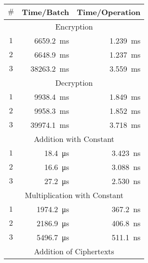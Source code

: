 \documentclass{article}
\begin{document}
        \begin{center}
            \begin{tabular}{| c | r | r |}
                \hline
                $\#$ & Time/Batch & Time/Operation
                \\ \hline
                \multicolumn{3}{|c|}{Encryption}
                \\ \hline
                $1$ & \SI{6659.2}{\milli\second} & \SI{1.239}{\milli\second}
                \\ \hline
                $2$ & \SI{6648.9}{\milli\second} & \SI{1.237}{\milli\second}
                \\ \hline
                $3$ & \SI{38263.2}{\milli\second} & \SI{3.559}{\milli\second}
                \\ \hline
                \multicolumn{3}{|c|}{Decryption}
                \\ \hline
                $1$ & \SI{9938.4}{\milli\second} & \SI{1.849}{\milli\second}
                \\ \hline
                $2$ & \SI{9958.3}{\milli\second} & \SI{1.852}{\milli\second}
                \\ \hline
                $3$ & \SI{39974.1}{\milli\second} & \SI{3.718}{\milli\second}
                \\ \hline
                \multicolumn{3}{|c|}{Addition with Constant}
                \\ \hline
                $1$ & \SI{18.4}{\micro\second} & \SI{3.423}{\nano\second}
                \\ \hline
                $2$ & \SI{16.6}{\micro\second} & \SI{3.088}{\nano\second}
                \\ \hline
                $3$ & \SI{27.2}{\micro\second} & \SI{2.530}{\nano\second}
                \\ \hline
                \multicolumn{3}{|c|}{Multiplication with Constant}
                \\ \hline
                $1$ & \SI{1974.2}{\micro\second} & \SI{367.2}{\nano\second}
                \\ \hline
                $2$ & \SI{2186.9}{\micro\second} & \SI{406.8}{\nano\second}
                \\ \hline
                $3$ & \SI{5496.7}{\micro\second} & \SI{511.1}{\nano\second}
                \\ \hline
                \multicolumn{3}{|c|}{Addition of Ciphertexts}
                \\ \hline

\end{tabular}
\end{center}
\end{document}
